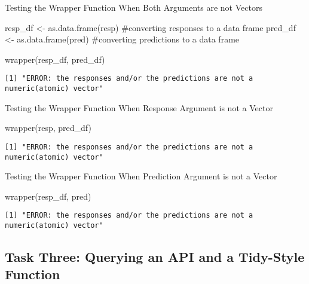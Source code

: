 \documentclass[
  letterpaper,
  DIV=11,
  numbers=noendperiod]{scrartcl}
\newenvironment{Shaded}{\begin{snugshade}}{\end{snugshade}}
\newcommand{\CommentTok}[1]{\textcolor[rgb]{0.37,0.37,0.37}{#1}}
\newcommand{\FunctionTok}[1]{\textcolor[rgb]{0.28,0.35,0.67}{#1}}
\newcommand{\NormalTok}[1]{\textcolor[rgb]{0.00,0.23,0.31}{#1}}
\newcommand{\OtherTok}[1]{\textcolor[rgb]{0.00,0.23,0.31}{#1}}
\begin{document}
Testing the Wrapper Function When Both Arguments are not Vectors

\begin{Shaded}
\begin{Highlighting}[]
\NormalTok{resp\_df }\OtherTok{\textless{}{-}} \FunctionTok{as.data.frame}\NormalTok{(resp) }\CommentTok{\#converting responses to a data frame}
\NormalTok{pred\_df }\OtherTok{\textless{}{-}} \FunctionTok{as.data.frame}\NormalTok{(pred) }\CommentTok{\#converting predictions to a data frame}

\FunctionTok{wrapper}\NormalTok{(resp\_df, pred\_df)}
\end{Highlighting}
\end{Shaded}

\begin{verbatim}
[1] "ERROR: the responses and/or the predictions are not a numeric(atomic) vector"
\end{verbatim}

Testing the Wrapper Function When Response Argument is not a Vector

\begin{Shaded}
\begin{Highlighting}[]
\FunctionTok{wrapper}\NormalTok{(resp, pred\_df)}
\end{Highlighting}
\end{Shaded}

\begin{verbatim}
[1] "ERROR: the responses and/or the predictions are not a numeric(atomic) vector"
\end{verbatim}

Testing the Wrapper Function When Prediction Argument is not a Vector

\begin{Shaded}
\begin{Highlighting}[]
\FunctionTok{wrapper}\NormalTok{(resp\_df, pred)}
\end{Highlighting}
\end{Shaded}

\begin{verbatim}
[1] "ERROR: the responses and/or the predictions are not a numeric(atomic) vector"
\end{verbatim}

\newpage

\subsection{Task Three: Querying an API and a Tidy-Style
Function}\label{task-three-querying-an-api-and-a-tidy-style-function}
\end{document}
